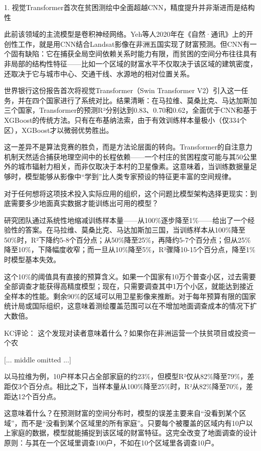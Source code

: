 \documentclass[11pt]{ctexart}
\begin{document}
1. 视觉Transformer首次在贫困测绘中全面超越CNN，精度提升并非渐进而是结构性

此前该领域的主流模型是卷积神经网络。Yeh等人2020年在《自然·通讯》上的开创性工作，就是用CNN结合Landsat影像在非洲五国实现了财富预测。但CNN有一个固有缺陷：它在捕获全局空间依赖关系时能力有限，而贫困的空间分布往往具有非局部的结构性特征——比如一个区域的财富水平不仅取决于该区域的建筑密度，还取决于它与城市中心、交通干线、水源地的相对位置关系。

世界银行这份报告首次将视觉Transformer（Swin Transformer V2）引入这一任务，并在四个国家进行了系统对比。结果清晰：在马拉维、莫桑比克、马达加斯加三个国家，Transformer的预测R²分别达到0.83、0.70和0.62，全面优于CNN和基于XGBoost的传统方法。只有在布基纳法索，由于有效训练样本量极小（仅334个区），XGBoost才以微弱优势胜出。

这一差异不是算法竞赛的胜负，而是方法论层面的转向。Transformer的自注意力机制天然适合捕获地理空间中的长程依赖——一个村庄的贫困程度可能与其50公里外的城市辐射力相关，而非仅取决于本村的卫星像素。这意味着，当训练数据量足够时，模型能够从影像中“学到”比人类专家预设的特征更丰富的空间规律。

对于任何想将这项技术投入实际应用的组织，这个问题比模型架构选择更现实：到底需要多少地面真实数据才能训练出可用的模型？

研究团队通过系统性地缩减训练样本量——从100\%逐步降至1\%——给出了一个经验性的答案。在马拉维、莫桑比克、马达加斯加三国，当训练样本从100\%降至50\%时，R²下降约5-8个百分点；从50\%降至25\%，再降约5-7个百分点；但从25\%降至10\%，下降幅度收窄；而一旦从10\%降至5\%，R²骤降10-15个百分点，降至1\%时模型基本失效。

这个10\%的阈值具有直接的预算含义。如果一个国家有10万个普查小区，过去需要全部调查才能获得高精度模型；现在，只需要调查其中1万个小区，就能达到接近全样本的性能。剩余90\%的区域可以用卫星影像来推断。对于每年预算有限的国家统计局或国际组织，这意味着测绘覆盖范围可以在不增加地面调查成本的情况下扩大数倍。

KC评论： 这个发现对读者意味着什么？如果你在非洲运营一个扶贫项目或投资一个农

[... middle omitted ...]

以马拉维为例，10户样本只占全部家庭的约23\%，但模型R²仅从82\%降至79\%，差距仅3个百分点。相比之下，当样本量从100\%降至25\%时，R²从82\%降至70\%，差距达12个百分点。

这意味着什么？在预测财富的空间分布时，模型的误差主要来自“没看到某个区域”，而不是“没看到某个区域里的所有家庭”。只要每个被覆盖的区域内有10户以上家庭的数据，模型就能捕捉到该区域的财富特征。这完全改变了地面调查的设计原则：与其在一个区域里调查100户，不如在10个区域里各调查10户。
\end{document}
